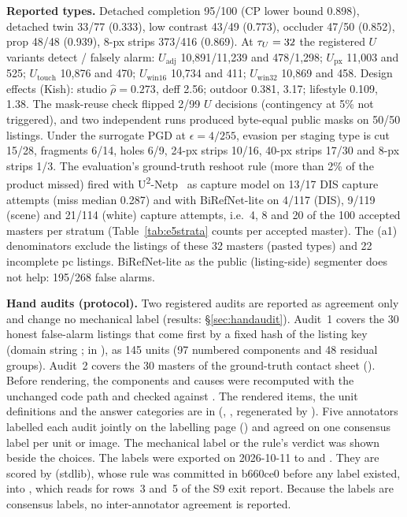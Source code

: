 \documentclass[10pt]{article}
\begin{document}
\textbf{Reported types.} Detached completion 95/100 (CP lower bound 0.898), detached twin 33/77 (0.333), low contrast
43/49 (0.773), occluder 47/50 (0.852), prop 48/48 (0.939), 8-px strips 373/416 (0.869). At $\tau_{U}=32$ the registered
$U$ variants detect / falsely alarm: $U_{\mathrm{adj}}$ 10,891/11,239 and 478/1,298; $U_{\mathrm{px}}$ 11,003 and 525;
$U_{\mathrm{touch}}$ 10,876 and 470; $U_{\mathrm{win16}}$ 10,734 and 411; $U_{\mathrm{win32}}$ 10,869 and 458. Design
effects (Kish): studio $\hat\rho=0.273$, deff 2.56; outdoor 0.381, 3.17; lifestyle 0.109, 1.38. The mask-reuse check
flipped 2/99 $U$ decisions (contingency at 5\% not triggered), and two independent runs produced byte-equal public masks on
50/50 listings. Under the surrogate PGD at $\epsilon=4/255$, evasion per staging type is cut 15/28, fragments 6/14,
holes 6/9, 24-px strips 10/16, 40-px strips 17/30 and 8-px strips 1/3. The evaluation's ground-truth reshoot rule (more
than 2\% of the product missed) fired with U\textsuperscript{2}-Netp~\cite{qin2020u2net} as capture model on 13/17 DIS
capture attempts (miss median 0.287) and with BiRefNet-lite on 4/117 (DIS), 9/119 (scene) and 21/114 (white) capture
attempts, i.e.\ 4, 8 and 20 of the 100 accepted masters
per stratum (Table~\ref{tab:e5strata} counts per accepted master). The (a1) denominators exclude the listings of these 32
masters (pasted types) and 22 incomplete pc listings. BiRefNet-lite as the public (listing-side) segmenter does not help: 195/268 false
alarms.

\textbf{Hand audits (protocol).} Two registered audits are reported as agreement only and change no mechanical label
(results: \S\ref{sec:handaudit}). Audit~1 covers the 30 honest false-alarm listings that come first by a fixed hash of the
listing key (domain string ;  in ),
as 145 units (97 numbered components and 48 residual groups). Audit~2 covers the 30 masters of the ground-truth
contact sheet (). Before rendering, the components and causes were recomputed
with the unchanged code path and checked against . The rendered items, the unit definitions and
the answer categories are in  (, , regenerated by
). Five annotators labelled each audit jointly on the labelling page
() and agreed on one consensus label per unit or image. The mechanical label or the rule's
verdict was shown beside the choices. The labels were exported on 2026-10-11 to  and
. They are scored by  (stdlib), whose rule was committed in
b660ce0 before any label existed, into , which  reads
for rows~3 and~5 of the S9 exit report. Because the labels are consensus labels, no inter-annotator agreement is
reported.
\end{document}
